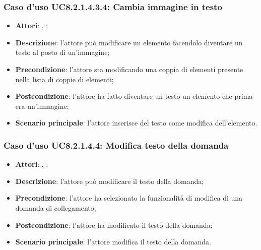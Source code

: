 		\subsubsection{Caso d'uso UC8.2.1.4.3.4: Cambia immagine in testo}
		\label{UC8.2.1.4.3.4}
		\begin{itemize}
			\item \textbf{Attori}: \uau, \uaupro;
			\item \textbf{Descrizione}: l'attore può modificare un elemento facendolo diventare un testo al posto di un'immagine;
			\item \textbf{Precondizione}: l'attore sta modificando una coppia di elementi presente nella lista di coppie di elementi; 
			\item \textbf{Postcondizione}: l'attore ha fatto diventare un testo un elemento che prima era un'immagine;
			\item \textbf{Scenario principale}: l'attore inserisce del testo come modifica dell'elemento.  
		\end{itemize}
		
			
	\subsubsection{Caso d'uso UC8.2.1.4.4: Modifica testo della domanda}
	\begin{itemize}
		\item
		\textbf{Attori}: \uau, \uaupro;
		\item		
		\textbf{Descrizione}: l'attore può modificare il testo della domanda;
		\item
			\textbf{Precondizione}: l'attore ha selezionato la funzionalità di modifica di una domanda di collegamento; 
		\item
			\textbf{Postcondizione}: l'attore ha modificato il testo della domanda;
		\item
			\textbf{Scenario principale}: l'attore modifica il testo della domanda.	
	\end{itemize}
